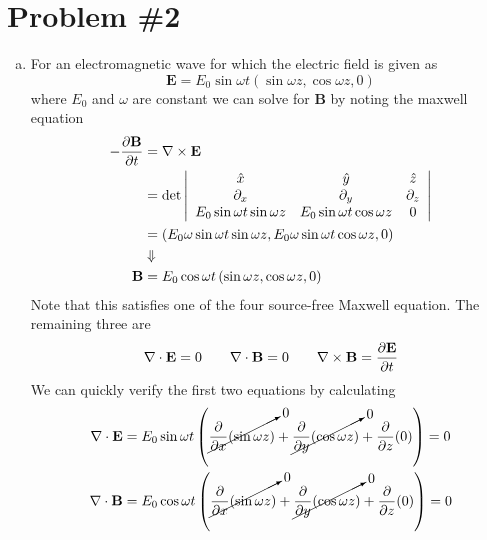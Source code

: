 \documentclass[11pt]{article}
\numberwithin{equation}{section}
\begin{document}
\section{Problem \#2}
\begin{enumerate}[(a)]
\item
    For an electromagnetic wave for which the electric field is given as
    \begin{equation}
        \mathbf{E} = E_0\sin\omega{t}\left(\sin\omega{z},\cos\omega{z},0\right)
    \label{Prob2a}
    \end{equation}
    where $E_0$ and $\omega$ are constant we can solve for $\mathbf{B}$ by noting the maxwell equation
    \begin{align*}
        -\frac{\partial{\mathbf{B}}}{\partial{t}} &= \bold\nabla\times\mathbf{E} \\
                                  &= \det\left|\begin{array}{ccc}
                                                \hat{x}                       &\hat{y}                        &\hat{z}\\
                                                \partial_{x}                  &\partial_{y}                   &\partial_{z}\\
                                                E_0\sin\omega{t}\sin\omega{z} &E_0\sin\omega{t}\cos\omega{z} &0
                                          \end{array}\right|\\
                                   &= (E_0\omega\sin\omega{t}\sin\omega{z}, E_0\omega\sin\omega{t}\cos\omega{z}, 0)\\
                                   &\Downarrow\\
                                          \mathbf{B} &= E_0\cos\omega{t}\left(\sin\omega{z}, \cos\omega{z}, 0\right)
    \end{align*}
    Note that this satisfies one of the four source-free Maxwell equation. The remaining three are
    $$\bold\nabla\cdot\mathbf{E}=0\qquad \bold\nabla\cdot\mathbf{B} = 0\qquad \bold\nabla\times\mathbf{B} = \frac{\partial{\mathbf{E}}}{\partial{t}}$$
    We can quickly verify the first two equations by calculating
    \begin{align*}
        \grad\cdot\mathbf{E} &= E_0\sin\omega{t}\left( \cancelto{0}{\partiald{}{x}(\sin\omega{z})} + \cancelto{0}{\partiald{}{y}(\cos\omega{z})} + \partiald{}{z}(0)\right) = 0\\
        \grad\cdot\mathbf{B} &= E_0\cos\omega{t}\left( \cancelto{0}{\partiald{}{x}(\sin\omega{z})} + \cancelto{0}{\partiald{}{y}(\cos\omega{z})} + \partiald{}{z}(0)\right) = 0

\end{align*}
\end{enumerate}
\end{document}

